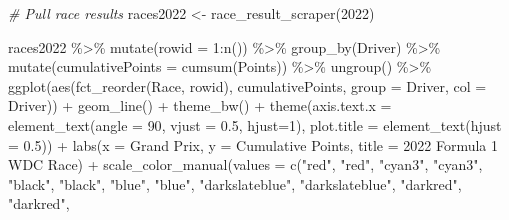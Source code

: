 \documentclass[
]{book}
\newenvironment{Shaded}{\begin{snugshade}}{\end{snugshade}}
\newcommand{\AttributeTok}[1]{\textcolor[rgb]{0.77,0.63,0.00}{#1}}
\newcommand{\CommentTok}[1]{\textcolor[rgb]{0.56,0.35,0.01}{\textit{#1}}}
\newcommand{\DecValTok}[1]{\textcolor[rgb]{0.00,0.00,0.81}{#1}}
\newcommand{\FloatTok}[1]{\textcolor[rgb]{0.00,0.00,0.81}{#1}}
\newcommand{\FunctionTok}[1]{\textcolor[rgb]{0.00,0.00,0.00}{#1}}
\newcommand{\NormalTok}[1]{#1}
\newcommand{\OtherTok}[1]{\textcolor[rgb]{0.56,0.35,0.01}{#1}}
\newcommand{\SpecialCharTok}[1]{\textcolor[rgb]{0.00,0.00,0.00}{#1}}
\newcommand{\StringTok}[1]{\textcolor[rgb]{0.31,0.60,0.02}{#1}}
\begin{document}
\begin{Shaded}
\begin{Highlighting}[]
\CommentTok{\# Pull race results}
\NormalTok{races2022 }\OtherTok{\textless{}{-}} \FunctionTok{race\_result\_scraper}\NormalTok{(}\DecValTok{2022}\NormalTok{)}

\NormalTok{races2022 }\SpecialCharTok{\%\textgreater{}\%}
  \FunctionTok{mutate}\NormalTok{(}\AttributeTok{rowid =} \DecValTok{1}\SpecialCharTok{:}\FunctionTok{n}\NormalTok{()) }\SpecialCharTok{\%\textgreater{}\%}
  \FunctionTok{group\_by}\NormalTok{(Driver) }\SpecialCharTok{\%\textgreater{}\%} 
  \FunctionTok{mutate}\NormalTok{(}\AttributeTok{cumulativePoints =} \FunctionTok{cumsum}\NormalTok{(Points)) }\SpecialCharTok{\%\textgreater{}\%}
  \FunctionTok{ungroup}\NormalTok{() }\SpecialCharTok{\%\textgreater{}\%} 
  \FunctionTok{ggplot}\NormalTok{(}\FunctionTok{aes}\NormalTok{(}\FunctionTok{fct\_reorder}\NormalTok{(Race, rowid), cumulativePoints,}
         \AttributeTok{group =}\NormalTok{ Driver, }\AttributeTok{col =}\NormalTok{ Driver)) }\SpecialCharTok{+}
  \FunctionTok{geom\_line}\NormalTok{() }\SpecialCharTok{+}
  \FunctionTok{theme\_bw}\NormalTok{() }\SpecialCharTok{+} 
  \FunctionTok{theme}\NormalTok{(}\AttributeTok{axis.text.x =} \FunctionTok{element\_text}\NormalTok{(}\AttributeTok{angle =} \DecValTok{90}\NormalTok{, }\AttributeTok{vjust =} \FloatTok{0.5}\NormalTok{, }\AttributeTok{hjust=}\DecValTok{1}\NormalTok{),}
        \AttributeTok{plot.title =} \FunctionTok{element\_text}\NormalTok{(}\AttributeTok{hjust =} \FloatTok{0.5}\NormalTok{)) }\SpecialCharTok{+}
  \FunctionTok{labs}\NormalTok{(}\AttributeTok{x =} \StringTok{\textquotesingle{}Grand Prix\textquotesingle{}}\NormalTok{,}
       \AttributeTok{y =} \StringTok{\textquotesingle{}Cumulative Points\textquotesingle{}}\NormalTok{,}
       \AttributeTok{title =} \StringTok{\textquotesingle{}2022 Formula 1 WDC Race\textquotesingle{}}\NormalTok{) }\SpecialCharTok{+}
  \FunctionTok{scale\_color\_manual}\NormalTok{(}\AttributeTok{values =} \FunctionTok{c}\NormalTok{(}\StringTok{"red"}\NormalTok{, }\StringTok{"red"}\NormalTok{, }
                                \StringTok{"cyan3"}\NormalTok{, }\StringTok{"cyan3"}\NormalTok{, }
                                \StringTok{"black"}\NormalTok{, }\StringTok{"black"}\NormalTok{,}
                                \StringTok{"blue"}\NormalTok{, }\StringTok{"blue"}\NormalTok{,}
                                \StringTok{"darkslateblue"}\NormalTok{, }\StringTok{"darkslateblue"}\NormalTok{,}
                                \StringTok{"darkred"}\NormalTok{, }\StringTok{"darkred"}\NormalTok{, }

\end{Highlighting}
\end{Shaded}
\end{document}
